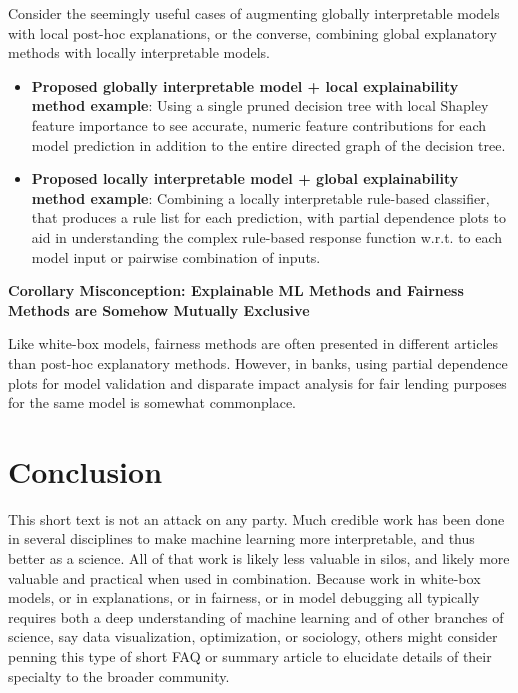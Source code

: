 \documentclass{article}
\begin{document}
Consider the seemingly useful cases of augmenting globally interpretable models with local post-hoc explanations, or the converse, combining global explanatory methods with locally interpretable models.

\begin{itemize}
\item \textbf{Proposed globally interpretable model + local explainability method example}: Using a single pruned decision tree with local Shapley feature importance to see accurate, numeric feature contributions for each model prediction in addition to the entire directed graph of the decision tree.
\item \textbf{Proposed locally interpretable model + global explainability method example}: Combining a locally interpretable rule-based classifier, that produces a rule list for each prediction, with partial dependence plots to aid in understanding the complex rule-based response function w.r.t. to each model input or pairwise combination of inputs.  
\end{itemize}

\textbf{Corollary Misconception: Explainable ML Methods and Fairness Methods are Somehow Mutually Exclusive}

Like white-box models, fairness methods are often presented in different articles than post-hoc explanatory methods. However, in banks, using partial dependence plots for model validation and disparate impact analysis for fair lending purposes for the same model is somewhat commonplace.

\section{Conclusion}

This short text is not an attack on any party. Much credible work has been done in several disciplines to make machine learning more interpretable, and thus better as a science. All of that work is likely less valuable in silos, and likely more valuable and practical when used in combination. Because work in white-box models, or in explanations, or in fairness, or in model debugging all typically requires both a deep understanding of machine learning and of other branches of science, say data visualization, optimization, or sociology, others might consider penning this type of short FAQ or summary article to elucidate details of their specialty to the broader community.    




\end{document}
